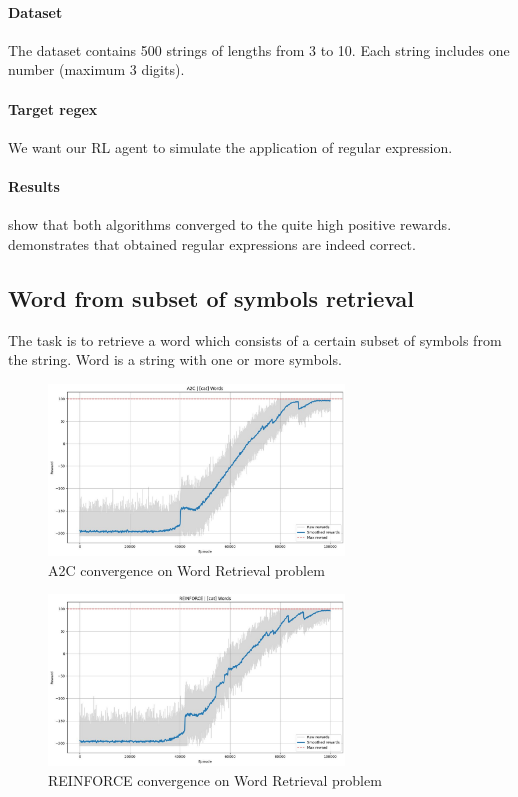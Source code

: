 \documentclass{article}
\begin{document}
\paragraph{Dataset}
The dataset contains 500 strings of lengths from 3 to 10. Each string includes one number (maximum 3 digits).

\paragraph{Target regex}
We want our RL agent to simulate the application of \codeword{\d} regular expression.

\paragraph{Results}
 show that both algorithms converged to the quite high positive rewards.  demonstrates that obtained regular expressions are indeed correct.

\subsection{Word from subset of symbols retrieval}
The task is to retrieve a word which consists of a certain subset of symbols from the string.
Word is a string with one or more symbols.


\begin{figure}[H]
  \centering
  \includegraphics[width=0.7\textwidth]{./pictures/a2c_words.jpg}
  \caption[A2C convergence on Single Number Retrieval problem]
  {A2C convergence on Word Retrieval problem}\label{fig:a2c_word}
\end{figure}

\begin{figure}[H]
  \centering
  \includegraphics[width=0.7\textwidth]{./pictures/reinforce_words.jpg}
  \caption[REINFORCE convergence on Word Retrieval problem]
  {REINFORCE convergence on Word Retrieval problem}\label{fig:reinforce_word}
\end{figure}
\end{document}
